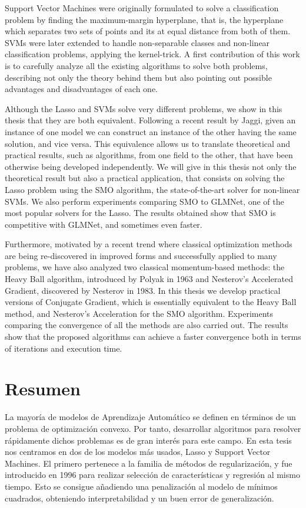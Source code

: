 \documentclass[a4paper, 11pt, openright, twoside]{reportPhD}
\numberwithin{equation}{section}
\numberwithin{figure}{chapter}
\numberwithin{table}{chapter}
\begin{document}
Support Vector Machines were originally formulated to solve a classification problem by finding the maximum-margin hyperplane, that is, the hyperplane which separates two sets of points and its at equal distance from both of them. SVMs were later extended to handle non-separable classes and non-linear classification problems, applying the kernel-trick. A first contribution of this work is to carefully analyze all the existing algorithms to solve both problems, describing not only the theory behind them but also pointing out possible advantages and disadvantages of each one.
 
Although the Lasso and SVMs solve very different problems, we show in this thesis that they are both equivalent. Following a recent result by Jaggi, given an instance of one model we can construct an instance of the other having the same solution, and vice versa. This equivalence allows us to translate theoretical and practical results, such as algorithms, from one field to the other, that have been otherwise being developed independently. We will give in this thesis not only the theoretical result but also a practical application, that consists on solving the Lasso problem using the SMO algorithm, the state-of-the-art solver for non-linear SVMs. We also perform experiments comparing SMO to GLMNet, one of the most popular solvers for the Lasso. The results obtained show that SMO is competitive with GLMNet, and sometimes even faster.
 
Furthermore, motivated by a recent trend where classical optimization methods are being re-discovered in improved forms and successfully applied to many problems, we have also analyzed two classical momentum-based methods: the Heavy Ball algorithm, introduced by Polyak in 1963 and Nesterov's Accelerated Gradient, discovered by Nesterov in 1983. In this thesis we develop practical versions of Conjugate Gradient, which is essentially equivalent to the Heavy Ball method, and Nesterov's Acceleration for the SMO algorithm. Experiments comparing the convergence of all the methods are also carried out. The results show that the proposed algorithms can achieve a faster convergence both in terms of iterations and execution time.

\chapter*{Resumen}
La mayoría de modelos de Aprendizaje Automático se definen en términos de un problema de
optimización convexo. Por tanto, desarrollar algoritmos para resolver rápidamente dichos problemas es de gran interés para este campo. En esta tesis nos centramos en dos de los modelos más usados, Lasso y Support Vector Machines. El primero pertenece a la familia de métodos de regularización, y fue introducido en 1996 para realizar selección de características y regresión al mismo tiempo. Esto se consigue añadiendo una penalización \lo al modelo de mínimos cuadrados, obteniendo interpretabilidad y un buen error de generalización.
\end{document}
